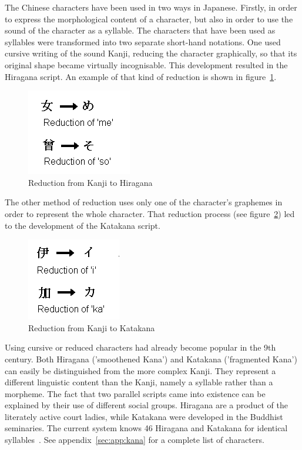 The Chinese characters have been used in two ways in Japanese. 
Firstly, in order to express the morphological content of a character,
but also in order to use the sound of the character as a syllable.
The characters that have been used as syllables were transformed into two 
separate short-hand notations. 
One used cursive writing of the sound Kanji, reducing the character 
graphically, so that its original shape became virtually incognisable.
This development resulted in the Hiragana script. An example of that kind of 
reduction is shown in figure~\ref{fig:reductiontohiragana}.
\begin{figure}[htbp]
\begin{center}
\includegraphics[scale=0.7]{images/reductiontohiragana.png}
\caption{Reduction from Kanji to Hiragana}
\label{fig:reductiontohiragana}
\end{center}
\end{figure}

The other method of reduction uses only one of the character's graphemes in
order to represent the whole character. That reduction process (see 
figure~\ref{fig:reductiontokatakana}) led to the development of the
Katakana script.
\begin{figure}[htbp] 
\begin{center}
\includegraphics[scale=0.7]{images/reductiontokatakana.png}
\caption{Reduction from Kanji to Katakana}
\label{fig:reductiontokatakana}
\end{center}
\end{figure}

Using cursive or reduced characters had already become popular in the 9th 
century.
Both Hiragana ('smoothened Kana') and Katakana ('fragmented Kana') can easily be 
distinguished from the more complex Kanji. They represent a different linguistic 
content than the Kanji, namely a syllable rather than a morpheme.
The fact that two parallel scripts came into existence can be explained by 
their use of different social groups. Hiragana are a product of the literately 
active court ladies, while Katakana were developed in the Buddhist seminaries.
The current system knows 46 Hiragana and Katakana for identical 
syllables~. See appendix~\ref{sec:app:kana} for a 
complete list of characters.

